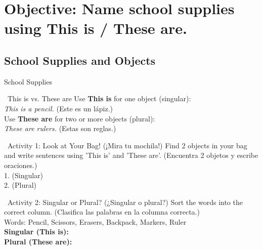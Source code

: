 \section*{Objective: Name school supplies using This is / These are.}

\subsection*{School Supplies and Objects}

\begin{vocabcard}{School Supplies}
\end{vocabcard}

\begin{grammartip}{ \ This is vs. These are}
  Use \textbf{This is} for one object (singular):\\
  \emph{This is a pencil.} (Este es un lápiz.)\\[1em]
  Use \textbf{These are} for two or more objects (plural):\\
  \emph{These are rulers.} (Estas son reglas.)
\end{grammartip}

\begin{activity}{ \ Activity 1: Look at Your Bag! (¡Mira tu mochila!)}
  Find 2 objects in your bag and write sentences using 'This is' and 'These are'. (Encuentra 2 objetos y escribe oraciones.)\\[1em]
  1. (Singular) \answerline[8cm]\\
  2. (Plural) \answerline[8cm]
\end{activity}

\begin{activity}{ \ Activity 2: Singular or Plural? (¿Singular o plural?)}
  Sort the words into the correct column. (Clasifica las palabras en la columna correcta.)\\[1em]
  Words: Pencil, Scissors, Erasers, Backpack, Markers, Ruler\\[1em]
  \textbf{Singular (This is):} \answerline[5cm]\\
  \textbf{Plural (These are):} \answerline[5cm]
\end{activity}

